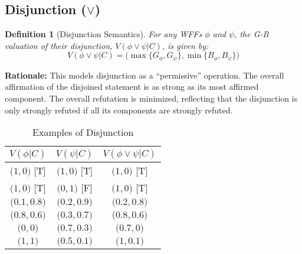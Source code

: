 \documentclass[11pt]{article}
\newcommand{\GB}[2]{\bigl(#1,#2\bigr)} %
\newtheorem{definition}{Definition}[section]
\theoremstyle{remark}
\begin{document}
\subsection{\texorpdfstring{Disjunction ($\lor$)}{Disjunction}}
\begin{definition}[Disjunction Semantics] \label{def:disjunction_sem}
For any WFFs $\phi$ and $\psi$, the G-B valuation of their disjunction, $V(\phi \lor \psi|C)$, is given by:
$$V(\phi \lor \psi|C) = \GB{\max\{G_\phi, G_\psi\}}{\min\{B_\phi, B_\psi\}}$$
\end{definition}
\textbf{Rationale:} This models disjunction as a ``permissive'' operation. The overall affirmation of the disjoined statement is as strong as its most affirmed component. The overall refutation is minimized, reflecting that the disjunction is only strongly refuted if all its components are strongly refuted.
\begin{table}[H] \centering \caption{Examples of Disjunction}\label{tab:disjunction_examples}
\begin{tabular}{@{}ccc@{}} \toprule
\textbf{$V(\phi|C)$} & \textbf{$V(\psi|C)$} & \textbf{$V(\phi \lor \psi|C)$} \\ \midrule
$\GB{1}{0}$ [T] & $\GB{1}{0}$ [T] & $\GB{1}{0}$ [T] \\
$\GB{1}{0}$ [T] & $\GB{0}{1}$ [F] & $\GB{1}{0}$ [T] \\
$\GB{0.1}{0.8}$ & $\GB{0.2}{0.9}$ & $\GB{0.2}{0.8}$ \\
$\GB{0.8}{0.6}$ & $\GB{0.3}{0.7}$ & $\GB{0.8}{0.6}$ \\
$\GB{0}{0}$ & $\GB{0.7}{0.3}$ & $\GB{0.7}{0}$ \\ 
$\GB{1}{1}$ & $\GB{0.5}{0.1}$ & $\GB{1}{0.1}$ \\ \bottomrule
\end{tabular} \end{table}
\end{document}
